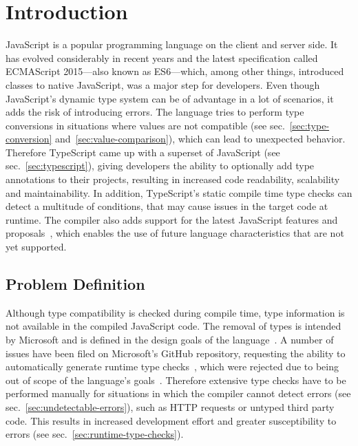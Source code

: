 \chapter{Introduction}
\label{cha:introduction}

JavaScript is a popular programming language on the client and server side. It has evolved considerably in recent years and the latest specification called ECMAScript 2015---also known as ES6---which, among other things, introduced classes to native JavaScript, was a major step for developers. Even though JavaScript's dynamic type system can be of advantage in a lot of scenarios, it adds the risk of introducing errors. The language tries to perform type conversions in situations where values are not compatible (see sec.~\ref{sec:type-conversion} and~\ref{sec:value-comparison}), which can lead to unexpected behavior. Therefore TypeScript came up with a superset of JavaScript (see sec.~\ref{sec:typescript}), giving developers the ability to optionally add type annotations to their projects, resulting in increased code readability, scalability and maintainability. In addition, TypeScript's static compile time type checks can detect a multitude of conditions, that may cause issues in the target code at runtime. The compiler also adds support for the latest JavaScript features and proposals~\cites{TypeScriptHandbook:CompilerOptions, TypeScriptWebsite}, which enables the use of future language characteristics that are not yet supported.

\section{Problem Definition}
\label{sec:problem-definition}

Although type compatibility is checked during compile time, type information is not available in the compiled JavaScript code. The removal of types is intended by Microsoft and is defined in the design goals of the language~\cite{TypeScriptWiki:DesignGoals}. A number of issues have been filed on Microsoft's GitHub repository, requesting the ability to automatically generate runtime type checks~\cites{TypeScriptIssue:RuntimeTypeChecking, TypeScriptIssue:RuntimeTypeChecks, TypeScriptIssue:EmitTypeArguments}, which were rejected due to being out of scope of the language's goals~\cites{TypeScriptIssue:RuntimeTypeChecking:Comment:OutOfScope, TypeScriptIssue:EmitTypeArguments:Comment:OutOfScope}. Therefore extensive type checks have to be performed manually for situations in which the compiler cannot detect errors (see sec.~\ref{sec:undetectable-errors}), such as HTTP requests or untyped third party code. This results in increased development effort and greater susceptibility to errors (see sec.~\ref{sec:runtime-type-checks}).


